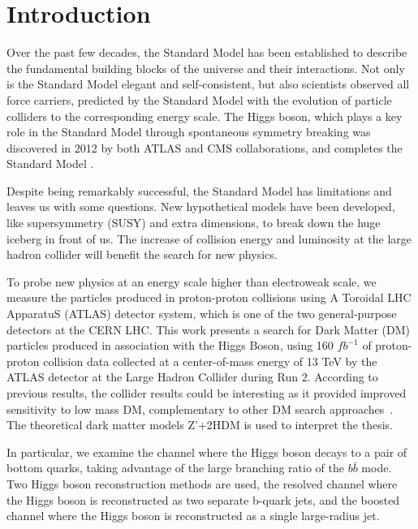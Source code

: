\chapter{Introduction}

\label{ch:intro}
\par Over the past few decades, the Standard Model has been established to describe the fundamental building blocks of the universe and their interactions.
 Not only is the Standard Model elegant and self-consistent, but also scientists observed all force carriers, predicted by the Standard Model with the evolution of particle colliders to the corresponding energy scale.
The Higgs boson, which plays a key role in the Standard Model through spontaneous symmetry breaking was discovered in 2012 by both ATLAS and CMS collaborations, 
and completes the Standard Model\cite{Aad:2012tfa} \cite{Chatrchyan:2012xdj}.

\par Despite being remarkably successful, the Standard Model has limitations and leaves us with some questions. 
New hypothetical models have been developed, like supersymmetry (SUSY) and extra dimensions,
to break down the huge iceberg in front of us. The increase of collision energy and luminosity at the large hadron collider will benefit the search for new physics.

\par To probe new physics at an energy scale higher than electroweak scale,
 we measure the particles produced in proton-proton collisions using A Toroidal LHC ApparatuS (ATLAS) detector system,
 which is one of the two general-purpose detectors at the CERN LHC. This work presents a search for Dark Matter (DM) particles produced in association
with the Higgs Boson, using 160 $fb^{-1}$ of proton-proton collision data collected at a center-of-mass energy of 13 TeV
by the ATLAS detector at the Large Hadron Collider during Run 2. 
According to previous results, the collider results could be interesting as it provided improved sensitivity to low mass DM, complementary to other DM search approaches~\cite{Penning:2017tmb}.
The theoretical dark matter models Z'+2HDM is used to interpret the thesis.

\par In particular, we examine the channel where the Higgs boson decays to a pair of bottom quarks, taking advantage of the large branching ratio of the $b\bar{b}$ mode. 
Two Higgs boson reconstruction methods are used, the resolved channel where the Higgs boson is reconstructed as two separate b-quark jets, 
and the boosted channel where the Higgs boson is reconstructed as a single large-radius jet.

